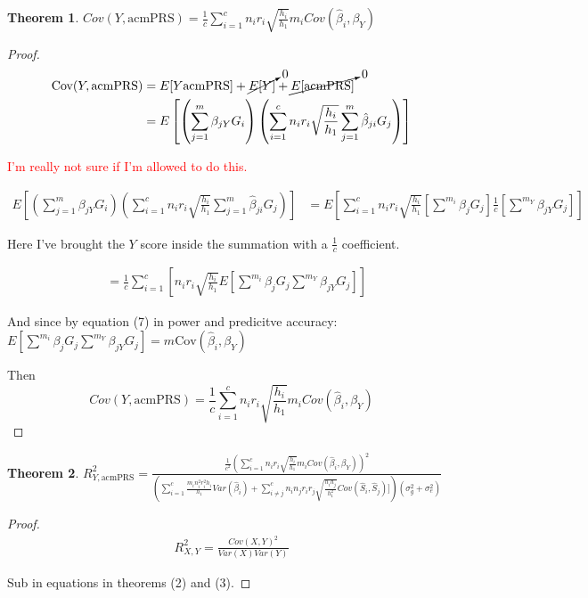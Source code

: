 \documentclass{article}
\newtheorem{theorem}{Theorem}
\begin{document}
\newpage

\begin{theorem}
$Cov(Y, \text{acmPRS}) = \frac{1}{c} \sum^c_{i=1} n_i r_i \sqrt{\frac{h_i}{h_1}} m_i Cov(\hat{\beta}_i, \beta_{Y})$
\end{theorem}

\begin{proof}

$$
\begin{aligned}
\text{Cov}(Y, \text{acmPRS}) &= E[Y \text{acmPRS}] + \cancelto{0}{E[Y]} + \cancelto{0}{E[\text{acmPRS}]} \\
&= E \left[ \left( \sum^m_{j=1} \beta_{j Y} G_i \right) \left( \sum^c_{i=1} n_i r_i \sqrt{\frac{h_i}{h_1}} \sum^m_{j=1} \hat{\beta}_{j i} G_j \right) \right] 
\end{aligned}
$$   

\textcolor{red}{I'm really not sure if I'm allowed to do this.}

$$ 
\begin{aligned}
E \left[ \left( \sum^m_{j=1} \beta_{j Y} G_i \right) \left( \sum^c_{i=1} n_i r_i \sqrt{\frac{h_i}{h_1}} \sum^m_{j=1} \hat{\beta}_{j i} G_j \right) \right] &= E \left[ \sum^c_{i=1} n_i r_i \sqrt{\frac{h_i}{h_1}} \left[ \sum^{m_i} \beta_j G_j \right] \frac{1}{c} \left[ \sum^{m_Y} \beta_{jY} G_j \right] \right]
\end{aligned}
$$

Here I've brought the $Y$ score inside the summation with a $\frac{1}{c}$ coefficient.

$$
\begin{aligned}
&= \frac{1}{c} \sum^c_{i=1} \left[ n_i r_i \sqrt{\frac{h_i}{h_1}} E \left[    \sum^{m_i} \beta_j G_j \sum^{m_Y} \beta_{jY} G_j \right] \right]
\end{aligned}
$$

And since by equation (7) in power and predicitve accuracy: $ E \left[ \sum^{m_i} \beta_j G_j \sum^{m_Y} \beta_{jY} G_j \right] = m \text{Cov} (\hat{\beta}_i, \beta_Y)$ 

Then
$$Cov(Y, \text{acmPRS}) = \frac{1}{c} \sum^c_{i=1} n_i r_i \sqrt{\frac{h_i}{h_1}} m_i Cov(\hat{\beta}_i, \beta_{Y})$$

\end{proof}

\newpage

\begin{theorem}
$R^2_{Y, \text{acmPRS}} = \frac{ \frac{1}{c^2} \left( \sum^c_{i=1} n_i r_i \sqrt{\frac{h_i}{h_1}} m_i Cov(\hat{\beta}_i, \beta_{Y}) \right)^2}{ \left( \sum^c_{i=1}  \frac{m_i n^2_i r^2_i h_i}{h_1}  Var(\hat{\beta}_i) +  \sum^c_{i \neq j} n_i n_j r_i r_j \sqrt{\frac{h_i h_j}{h^2_1}} Cov(\hat{S}_i, \hat{S}_j)] \right) \left( \sigma^2_{g} + \sigma^2_{e} \right)}$
\end{theorem}

\begin{proof}

$$
\begin{aligned}
R^2_{X, Y} = \frac{Cov(X,Y)^2}{Var(X)Var(Y)}
\end{aligned}
$$

Sub in equations in theorems (2) and (3).

\end{proof}
\end{document}
